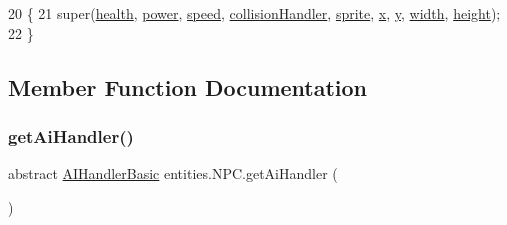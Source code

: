 \begin{DoxyCode}
20                                                                                                            
                                                                 \{
21         super(\mbox{\hyperlink{classentities_1_1_subject_a8285660fdae3f0b220bbc686cf5c012c}{health}}, \mbox{\hyperlink{classentities_1_1_subject_a7bd41d6fe9656de66d4a08c4a9565ec4}{power}}, \mbox{\hyperlink{classentities_1_1_mobile_entity_a815a9d2b23a0bb7e3ee7739d4c10d7c3}{speed}}, \mbox{\hyperlink{classentities_1_1_mobile_entity_a29fbe797671b1fc81eafe1e48fdc46f9}{collisionHandler}}, 
      \mbox{\hyperlink{classentities_1_1_physical_entity_aeb439b2308ab19fb6d3ff6be6f7cdbd8}{sprite}}, \mbox{\hyperlink{classorg_1_1newdawn_1_1slick_1_1geom_1_1_shape_a3e985bfff386c15a4efaad03d8ad60d3}{x}}, \mbox{\hyperlink{classorg_1_1newdawn_1_1slick_1_1geom_1_1_shape_a9f934baded6a1b65ebb69e7e5f80ea00}{y}}, \mbox{\hyperlink{classorg_1_1newdawn_1_1slick_1_1geom_1_1_rectangle_a967e1823f62daf45abb142779d1be62d}{width}}, \mbox{\hyperlink{classorg_1_1newdawn_1_1slick_1_1geom_1_1_rectangle_a3bd010fdce636fc11ed0e0ad4d4b4a0a}{height}});
22     \}
\end{DoxyCode}


\subsection{Member Function Documentation}
\mbox{\label{classentities_1_1_n_p_c_ab3791fbd872c3444c2da707a93e9897b}} 
\subsubsection{\texorpdfstring{get\+Ai\+Handler()}{getAiHandler()}}
{\footnotesize\ttfamily abstract \mbox{\hyperlink{classentities_1_1_a_i_handler_basic}{A\+I\+Handler\+Basic}} entities.\+N\+P\+C.\+get\+Ai\+Handler (\begin{DoxyParamCaption}{ }\end{DoxyParamCaption})\hspace{0.3cm}{\ttfamily [abstract]}}

\mbox{\label{classentities_1_1_n_p_c_a82d20902f2142d2621cf93335da23149}} 
